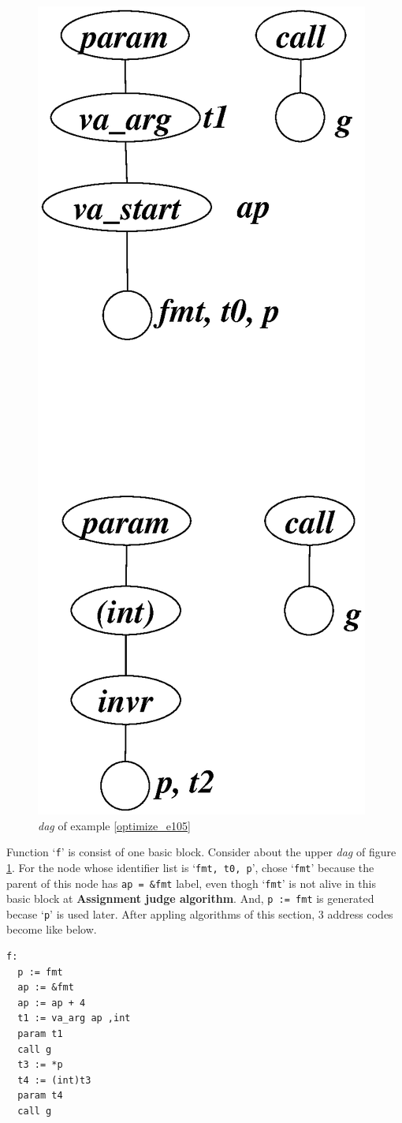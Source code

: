 \begin{Example}
\begin{figure}[htbp]
\begin{center}
\begin{latexonly}
\includegraphics[width=0.546\linewidth,height=1.2\linewidth]{opt046.eps}
\end{latexonly}
\caption{{\em dag} of example \ref{optimize_e105}}
\label{optimize_e106}
\end{center}
\end{figure}
Function `{\tt{f}}' is consist of one basic block. Consider about
the upper {\em dag} of figure \ref{optimize_e106}.
For the node whose identifier list is `{\tt{fmt, t0, p}}',
chose `{\tt{fmt}}' because the parent of this node has 
{\tt{ap = \&fmt}} label, even thogh `{\tt{fmt}}' is not alive
in this basic block at {\bf Assignment judge algorithm}.
And, {\tt{p := fmt}} is generated becase `{\tt{p}}' is used later.
After appling algorithms of this section,
3 address codes become like below.
\begin{verbatim}
f:
  p := fmt
  ap := &fmt
  ap := ap + 4
  t1 := va_arg ap ,int
  param t1
  call g
  t3 := *p
  t4 := (int)t3
  param t4
  call g
\end{verbatim}
\end{Example}

